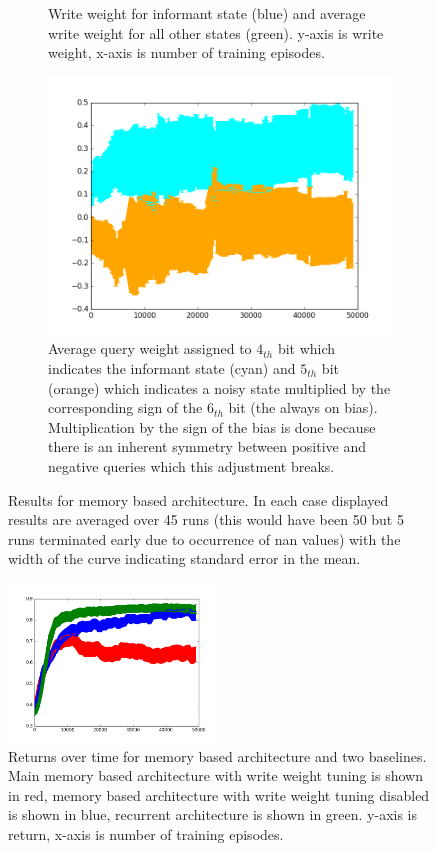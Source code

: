 \documentclass{article}
\begin{document}
\begin{figure}[!ht]
\begin{subfigure}[t]{.45\textwidth}
  \caption{Write weight for informant state (blue) and average write weight for all other states (green). y-axis is write weight, x-axis is number of training episodes.}
  \label{fig:1_query_write}
\end{subfigure}\vfill
\begin{subfigure}[t]{.45\textwidth}
\centering
      \includegraphics[width=1\textwidth]{images/queries.png}
  \caption{Average query weight assigned to $4_{th}$ bit which indicates the informant state (cyan) and $5_{th}$ bit (orange) which indicates a noisy state multiplied by the corresponding sign of the $6_{th}$ bit (the always on bias). Multiplication by the sign of the bias is done because there is an inherent symmetry between positive and negative queries which this adjustment breaks.}
\label{fig:1_query_queries}
\end{subfigure}
\caption{Results for memory based architecture. In each case displayed results are averaged over 45 runs (this would have been 50 but 5 runs terminated early due to occurrence of nan values) with the width of the curve indicating standard error in the mean.}
\label{fig:1_query}
\end{figure}

\begin{figure}[!ht]
\center
\includegraphics[width=0.5\textwidth]{images/combined_ret.png}
\caption{Returns over time for memory based architecture and two baselines. Main memory based architecture with write weight tuning is shown in red, memory based architecture with write weight tuning disabled is shown in blue, recurrent architecture is shown in green. y-axis is return, x-axis is number of training episodes.}
\label{fig:comparison}
\end{figure}
\end{document}
